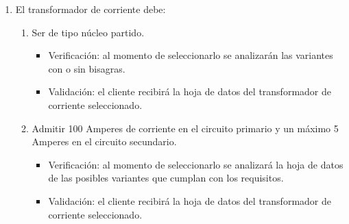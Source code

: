 \documentclass[11pt]{charter}
\begin{document}
\begin{enumerate}
\begin{enumerate}[label*=\arabic*.]
			\item El transformador de corriente debe:
			\begin{enumerate}[label*=\arabic*.]
				\item Ser de tipo núcleo partido.
					\begin{itemize}
						\item Verificación: al momento de seleccionarlo se analizarán las variantes con o sin bisagras.\\
						\item Validación: el cliente recibirá la hoja de datos del transformador de corriente seleccionado.\\
					\end{itemize}
				\item Admitir 100 Amperes de corriente en el circuito primario y un máximo 5 Amperes en el circuito secundario.
					\begin{itemize}
						\item Verificación: al momento de seleccionarlo se analizará la hoja de datos de las posibles variantes que cumplan con los requisitos.\\
						\item Validación: el cliente recibirá la hoja de datos del transformador de corriente seleccionado.\\
					\end{itemize}
			\end{enumerate}
			

\end{enumerate}
\end{enumerate}
\end{document}
